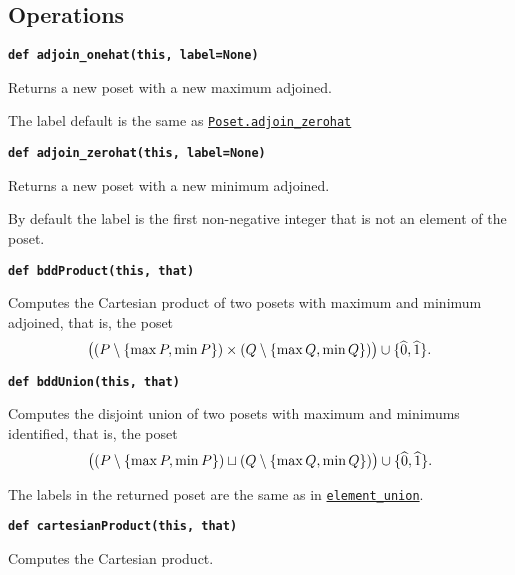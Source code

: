 \documentclass[12pt]{article}
\begin{document}
\begin{child}
\subsection{Operations}
\label{Operations}

\textbf{\hypertarget{Poset.adjoin_onehat}{\texttt{def adjoin\_onehat(this, label=None)}}}
{\list{}{\leftmargin 0.5cm}\item{
Returns a new poset with a new maximum adjoined.

The label default is the same as \hyperlink{Poset.adjoin_zerohat}{\texttt{Poset.adjoin\_zerohat}}


}\endlist}

\textbf{\hypertarget{Poset.adjoin_zerohat}{\texttt{def adjoin\_zerohat(this, label=None)}}}
{\list{}{\leftmargin 0.5cm}\item{
Returns a new poset with a new minimum adjoined.

By default the label is the first non-negative integer that is not an element of the poset.


}\endlist}

\textbf{\hypertarget{Poset.bddProduct}{\texttt{def bddProduct(this, that)}}}
{\list{}{\leftmargin 0.5cm}\item{
Computes the Cartesian product of two posets with maximum and minimum adjoined, that is, the poset \[\big((P\setminus\{\max P,\min P\})\times(Q\setminus\{\max Q,\min Q\})\big)\cup\{\widehat{0},\widehat{1}\}.\]


}\endlist}

\textbf{\hypertarget{Poset.bddUnion}{\texttt{def bddUnion(this, that)}}}
{\list{}{\leftmargin 0.5cm}\item{
Computes the disjoint union of two posets with maximum and minimums identified, that is, the poset \[\big( (P\setminus\{\max P,\min P\})\sqcup(Q\setminus\{\max Q,\min Q\})\big)\cup\{\widehat{0},\widehat{1}\}.\]

The labels in the returned poset are the same as in \hyperlink{Poset.element_union}{\texttt{element\_union}}.


}\endlist}

\textbf{\hypertarget{Poset.cartesianProduct}{\texttt{def cartesianProduct(this, that)}}}
{\list{}{\leftmargin 0.5cm}\item{
Computes the Cartesian product.


}}
\end{child}
\end{document}
